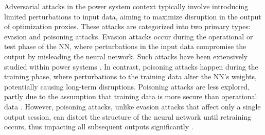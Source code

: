 
Adversarial attacks in the power system context typically involve introducing limited perturbations to input data, aiming to maximize disruption in the output of optimization proxies. These attacks are categorized into two primary types: evasion and poisoning attacks. Evasion attacks occur during the operational or test phase of the NN, where perturbations in the input data compromise the output by misleading the neural network. Such attacks have been extensively studied within power systems \cite{Wang2024Evasion}. In contrast, poisoning attacks happen during the training phase, where perturbations to the training data alter the NN's weights, potentially causing long-term disruptions. Poisoning attacks are less explored, partly due to the assumption that training data is more secure than operational data \cite{agah2024datapois}. However, poisoning attacks, unlike evasion attacks that affect only a single output session, can distort the structure of the neural network until retraining occurs, thus impacting all subsequent outputs significantly \cite{abbasi2023brainwash}.

